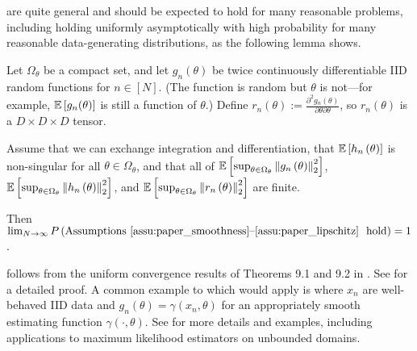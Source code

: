\coreassum are quite general and should be expected to hold for many reasonable
problems, including holding uniformly asymptotically with high probability for
many reasonable data-generating distributions, as the following lemma shows.
%
\begin{lem}
\label{lem:assumptions_hold}
%
Let $\Omega_{\theta}$ be a compact set, and let
$g_{n}\left(\theta\right)$ be twice continuously differentiable IID random
functions for $n \in [N]$.  (The function is random but $\theta$ is not---for example,
$\mathbb{E}\left[g_n(\theta)\right]$ is still a function of $\theta$.)
Define
$r_{n}\left(\theta\right) :=
    \frac{\partial^{2}g{}_{n}\left(\theta\right)}
    {\partial\theta\partial\theta}$,
so $r_{n}\left(\theta\right)$ is a $D\times D\times D$ tensor.

Assume that we can exchange integration and differentiation, that
$\mathbb{E}\left[h_{n}\left(\theta\right)\right]$ is non-singular for
all $\theta\in\Omega_{\theta}$,
and that all of
$\mathbb{E}\left[\sup_{\theta\in\Omega_{\theta}}\left\Vert g_{n}\left(\theta\right)\right\Vert_{2}^{2}\right]$,
$\mathbb{E}\left[\sup_{\theta\in\Omega_{\theta}}\left\Vert h_{n}\left(\theta\right)\right\Vert_{2}^{2}\right]$,
and
$\mathbb{E}\left[\sup_{\theta\in\Omega_{\theta}}\left\Vert r_{n}\left(\theta\right)\right\Vert_{2}^{2}\right]$
are finite.

Then $\lim_{N\rightarrow\infty}P\left(\textrm{\coreassum\ hold}\right)=1$.
%
\end{lem}
%
 follows from
the uniform convergence results of Theorems 9.1 and 9.2 in
\citet{keener:2011:theoretical}.
See  for a detailed proof.  A common example to which
 would apply is where $x_n$ are well-behaved
IID data and $g_n(\theta) = \gamma(x_n, \theta)$ for an appropriately
smooth estimating function $\gamma(\cdot, \theta)$.
See \citet[Chapter 9]{keener:2011:theoretical} for more details and examples,
including applications to maximum likelihood estimators on unbounded domains.

